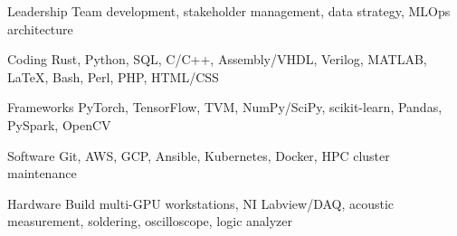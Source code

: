 

\begin{cvskills}

  \cvskill
    {Leadership} %
    {Team development, stakeholder management, data strategy, MLOps architecture} %

  \cvskill
    {Coding} %
    {Rust, Python, SQL, C/C++, Assembly/VHDL, Verilog, MATLAB\textregistered, LaTeX, Bash, Perl, PHP, HTML/CSS} %

  \cvskill
    {Frameworks} %
    {PyTorch, TensorFlow, TVM, NumPy/SciPy, scikit-learn, Pandas, PySpark, OpenCV} %
    
  \cvskill
    {Software} %
    {Git, AWS, GCP, Ansible, Kubernetes, Docker, HPC cluster maintenance} %

   \cvskill
     {Hardware} %
     {Build multi-GPU workstations, NI Labview/DAQ, acoustic measurement, soldering, oscilloscope, logic analyzer} %

\end{cvskills}
